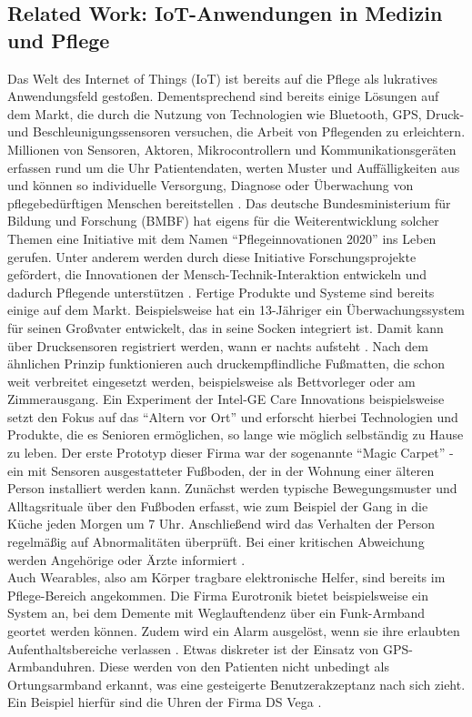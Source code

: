 \subsection{Related Work: IoT-Anwendungen in Medizin und Pflege}\label{ssec:rel.work}
Das Welt des Internet of Things (IoT) ist bereits auf die Pflege als lukratives Anwendungsfeld gestoßen.
 Dementsprechend sind bereits einige Lösungen auf dem Markt, die durch die Nutzung von Technologien wie Bluetooth, GPS, Druck- und Beschleunigungssensoren versuchen, die Arbeit von Pflegenden zu erleichtern. Millionen von Sensoren, Aktoren, Mikrocontrollern und Kommunikationsgeräten erfassen rund um die Uhr Patientendaten, werten Muster und Auffälligkeiten aus und können so individuelle Versorgung, Diagnose oder Überwachung von pflegebedürftigen Menschen bereitstellen \citep[Vgl.][]{digikey}.
Das deutsche Bundesministerium für Bildung und Forschung (BMBF) hat eigens für die Weiterentwicklung solcher Themen eine Initiative mit dem Namen \enquote{Pflegeinnovationen 2020} ins Leben gerufen. Unter anderem werden durch diese Initiative Forschungsprojekte gefördert, die Innovationen der Mensch-Technik-Interaktion entwickeln und dadurch Pflegende unterstützen \citep[Vgl.][]{bmbf}. Fertige Produkte und Systeme sind bereits einige auf dem Markt.
Beispielsweise hat ein 13-Jähriger ein Überwachungssystem für seinen Großvater entwickelt, das in seine Socken integriert ist. Damit kann über Drucksensoren registriert werden, wann er nachts aufsteht \citep[Vgl.][]{spiegel-alzheimer}. Nach dem ähnlichen Prinzip funktionieren auch druckempflindliche Fußmatten, die schon weit verbreitet eingesetzt werden, beispielsweise als Bettvorleger oder am Zimmerausgang.  Ein Experiment der Intel-GE Care Innovations beispielsweise setzt den Fokus auf das \enquote{Altern vor Ort} und erforscht hierbei Technologien und Produkte, die es Senioren ermöglichen, so lange wie möglich selbständig zu Hause zu leben. Der erste Prototyp dieser Firma war der sogenannte \enquote{Magic Carpet} - ein mit Sensoren ausgestatteter Fußboden, der in der Wohnung einer älteren Person installiert werden kann. Zunächst werden typische Bewegungsmuster und Alltagsrituale über den Fußboden erfasst, wie zum Beispiel der Gang in die Küche jeden Morgen um 7 Uhr. Anschließend wird das Verhalten der Person regelmäßig auf Abnormalitäten überprüft. Bei einer kritischen Abweichung werden Angehörige oder Ärzte informiert \citep[Vgl.][S.49]{bigdata}.\\
Auch Wearables, also am Körper tragbare elektronische Helfer, sind bereits im Pflege-Bereich angekommen. Die Firma Eurotronik bietet beispielsweise ein System an, bei dem Demente mit Weglauftendenz über ein Funk-Armband geortet werden können. Zudem wird ein Alarm ausgelöst, wenn sie ihre erlaubten Aufenthaltsbereiche verlassen \citep[Vgl.][]{eurotronik}. Etwas diskreter ist der Einsatz von GPS-Armbanduhren. Diese werden von den Patienten nicht unbedingt als Ortungsarmband erkannt, was eine gesteigerte Benutzerakzeptanz nach sich zieht. Ein Beispiel hierfür sind die Uhren der Firma DS Vega \citep[Vgl.][]{ds-vega}.
